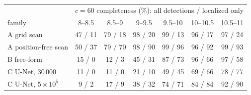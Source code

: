 \begin{tabular}{@{}lcccccc@{}}
\toprule
 & \multicolumn{6}{c}{$c=60$ completeness (\%): all detections / localized only} \\
family & 8--8.5 & 8.5--9 & 9--9.5 & 9.5--10 & 10--10.5 & 10.5--11 \\
\midrule
A grid scan & 47 / 11 & 79 / 18 & 98 / 20 & 99 / 13 & 96 / 17 & 97 / 24 \\
A position-free scan & 50 / 37 & 79 / 70 & 98 / 90 & 99 / 96 & 96 / 92 & 99 / 93 \\
B free-form & 15 / 0 & 12 / 3 & 45 / 31 & 87 / 73 & 96 / 66 & 97 / 58 \\
C U-Net, 30\,000 & 11 / 0 & 11 / 0 & 21 / 10 & 49 / 45 & 69 / 66 & 78 / 77 \\
C U-Net, $5\times10^{5}$ & 9 / 2 & 17 / 9 & 38 / 32 & 74 / 71 & 84 / 84 & 92 / 90 \\
\bottomrule
\end{tabular}
